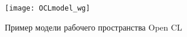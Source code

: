 \begin{figure}[h!]
  \centering
  \texttt{[image: OCLmodel\_wg]} 
  \caption{Пример модели рабочего пространства Open CL}
  \label{fig:OCL_wg}
\end{figure}
\FloatBarrier



\begin{comment}

Из RAM управляющего процессора
в VRAM вычислительного ускорителя
загружаются следующие данные: 
\begin{itemize}
\item
  Массив значений в узлах крупной сетки. %
\item
  Массив значений ядра порядка $r$. %
  C учётом финитности ядна и его симметричности по
  обом координатам хранить достаточно одну четверть.
  Инициализируется предварительно.
\end{itemize}

Результирующие значения в узлах мелкой сетки выгружаются управляющим процессором
из VRAM по завершению работы вычислительных ядер на ускорителе.

Программная реализация рассмотренного алгоритма в двухмерном случае
включает в себя 2 вычислительных ядра, соответствующие этапам схемы вычислений.
Первое вычислительное ядро выполняется в размерности рабочего пространства $K$,
для второго удобно выбрать размерность $M$.
Далее приведено описание, разработаных вычислительных ядрер.
\begin{itemize}
\item
  {\bf kernel prod}

  Выполняется в каждой точке крупной сетки.
  Каждый вычислительны элемент 
  получает точку крупной сетки
  из VRAM по $globalID$. 
  

  На выходе в VRAM
  формируются массивы произведений в $(r/2)^2$ ячейках мелкой сетки  
  соответствующие каждой точке крупной сетки.

  
\item
  {\bf kernel sum}

  Суммирует $r$ ближайших по каждой координате к $globalID$ произведений. 
  Выполняется в каждой точке мелкой сетки.
  
  
  Каждый вычислительный элемент записывает свою точку мелкой сетки в
  массив в VRAM по GlobalID
\end{itemize}

\end{comment}





